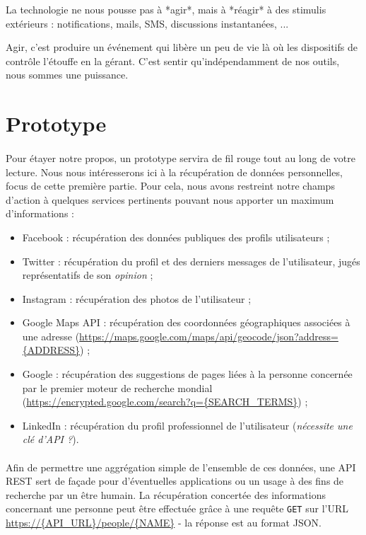 La technologie ne nous pousse pas à *agir*, mais à *réagir* à des stimulis extérieurs :
notifications, mails, SMS, discussions instantanées, ...

Agir, c'est produire un événement qui libère un peu de vie là où les dispositifs de contrôle
l'étouffe en la gérant. C'est sentir qu'indépendamment de nos outils, nous sommes une puissance.


\section*{Prototype}

\paragraph{} Pour étayer notre propos, un prototype servira de fil rouge tout au
long de votre lecture. Nous nous intéresserons ici à la récupération de données personnelles,
focus de cette première partie. Pour cela, nous avons restreint notre champs d'action à quelques
services pertinents pouvant nous apporter un maximum d'informations :

\begin{itemize}
    \item Facebook : récupération des données publiques des profils utilisateurs ;
    \item Twitter : récupération du profil et des derniers messages de l'utilisateur, jugés
    représentatifs de son \emph{opinion} ;
    \item Instagram : récupération des photos de l'utilisateur ; 
    \item Google Maps API : récupération des coordonnées géographiques associées à une adresse
    (\url{https://maps.google.com/maps/api/geocode/json?address={ADDRESS}}) ;
    \item Google : récupération des suggestions de pages liées à la personne concernée par le
    premier moteur de recherche mondial (\url{https://encrypted.google.com/search?q={SEARCH_TERMS}}) ;
    \item LinkedIn : récupération du profil professionnel de l'utilisateur (\emph{nécessite une clé d'API ?}).
\end{itemize}

\paragraph{} Afin de permettre une aggrégation simple de l'ensemble de ces données, une 
API REST sert de façade pour d'éventuelles applications ou un usage à des fins de recherche
par un être humain. La récupération concertée des informations concernant une personne peut
être effectuée grâce à une requête \lstinline{GET} sur l'URL \url{https://{API_URL}/people/{NAME}}
- la réponse est au format JSON.


